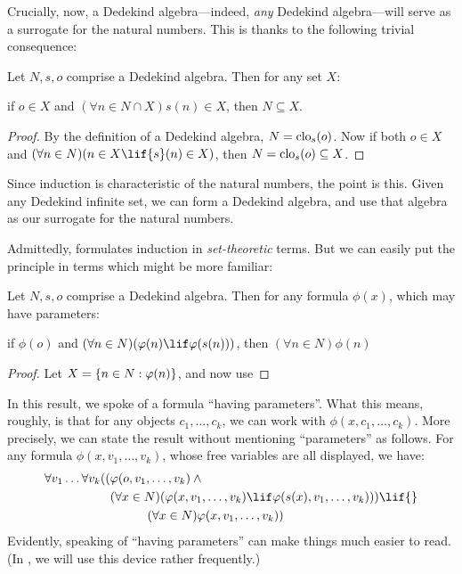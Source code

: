 \documentclass[../../../include/open-logic-section]{subfiles}
\begin{document}

Crucially, now, a Dedekind algebra---indeed, \emph{any} Dedekind
algebra---will serve as a surrogate for the natural numbers. This is
thanks to the following trivial consequence:

\begin{thm}
Let $N, s, o$ comprise a Dedekind algebra. Then for any set $X$:  
	\begin{center}
		if $o \in X$ and $(\forall {n} \in N \cap X){s}({n}) \in X$, {then} $N \subseteq X$.
	\end{center}
\end{thm}

\begin{proof}
By the definition of a Dedekind algebra, $N = \mathrm{clo}_{s}(o)$.
Now if both ${o} \in X$ and $(\forall {n} \in N)(n \in X \lif
{s}({n}) \in X)$, then $N = \mathrm{clo}_{s}(o) \subseteq X$.
\end{proof}

Since induction is characteristic of the natural numbers, the point is
this. Given any Dedekind infinite set, we can form a Dedekind algebra,
and use that algebra as our surrogate for the natural numbers. 

Admittedly,  formulates induction in
\emph{set-theoretic} terms. But we can easily put the principle in
terms which might be more familiar:

\begin{cor}
Let $N, s, o$ comprise a Dedekind algebra. Then for any formula
$\phi(x)$, which may have parameters:
\begin{center}
	if $\phi(o)$ and $(\forall {n} \in N)(\phi(n)\lif
	\phi({s}({n})))$, {then} $(\forall n \in N)\phi(n)$
\end{center}
\end{cor}

\begin{proof}
Let $X = \{ n \in N : \varphi(n) \}$, and now use
\end{proof}

In this result, we spoke of a formula ``having parameters''. What this
means, roughly, is that for any objects $c_1, \ldots, c_k$, we can
work with $\phi(x, c_1, \ldots, c_k)$. More precisely, we can state
the result without mentioning ``parameters'' as follows. For any
formula $\phi(x, v_1, \ldots, v_k)$, whose free variables are all
displayed, we have:
	\begin{align*}
			\forall v_1 \ldots \forall v_k((&\phi(o, v_1,\ldots, v_k) \land {}\\
			&	(\forall x \in N)(\phi(x,v_1, \ldots, v_k) \lif \phi(s(x), v_1,\ldots, v_k))) \lif {}\\
			&\hspace{3em} (\forall x \in N)\phi(x, v_1,\ldots, v_k))
	\end{align*}
Evidently, speaking of ``having parameters'' can make things much
easier to read. (In , we will use this device
rather frequently.)
\end{document}
